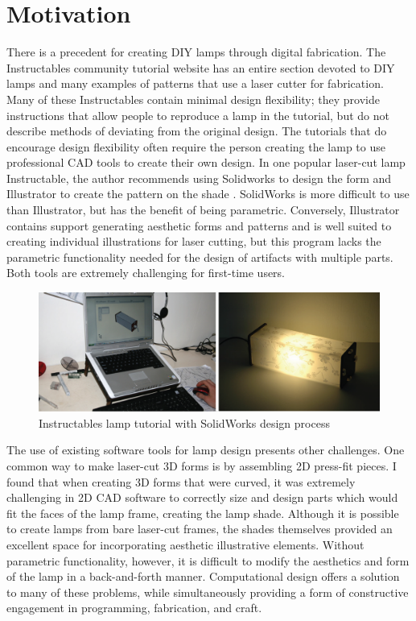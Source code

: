 \section{Motivation}
There is a precedent for creating DIY lamps through digital fabrication. The Instructables community tutorial website has an entire section devoted to DIY lamps and many examples of patterns that use a laser cutter for fabrication. Many of these Instructables contain minimal design flexibility; they provide instructions that allow people to reproduce a lamp in the tutorial, but do not describe methods of deviating from the original design. The tutorials that do encourage design flexibility often require the person creating the lamp to use professional CAD tools to create their own design. In one popular laser-cut lamp Instructable, the author recommends using Solidworks to design the form and Illustrator to create the pattern on the shade \cite{instructables_lamp}. SolidWorks is more difficult to use than Illustrator, but has the benefit of being parametric. Conversely, Illustrator contains support generating aesthetic forms and patterns and is well suited to creating individual illustrations for laser cutting, but this program lacks the parametric functionality needed for the design of artifacts with multiple parts. Both tools are extremely challenging for first-time users.
\begin{center}
\begin{figure}[h!]
\includegraphics[width=\columnwidth]{images/solidworks_lamp.png}
\caption{Instructables lamp tutorial with SolidWorks design process}
\end{figure}
\end{center}
The use of existing software tools for lamp design presents other challenges. One common way to make laser-cut 3D forms is by assembling 2D press-fit pieces. I found that when creating 3D forms that were curved, it was extremely challenging in 2D CAD software to correctly size and design parts which would fit the faces of the lamp frame, creating the lamp shade. Although it is possible to create lamps from bare laser-cut frames, the shades themselves provided an excellent space for incorporating aesthetic illustrative elements. Without parametric functionality, however, it is difficult to modify the aesthetics and form of the lamp in a back-and-forth manner. Computational design offers a solution to many of these problems, while simultaneously providing a form of constructive engagement in programming, fabrication, and craft.

